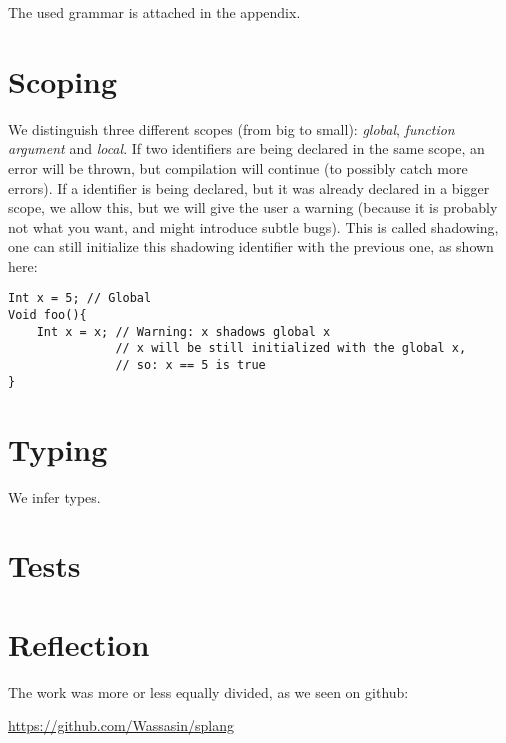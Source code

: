 \documentclass[14pt]{amsart}
\begin{document}
The used grammar is attached in the appendix.

\section{Scoping}
We distinguish three different scopes (from big to small): \emph{global}, \emph{function argument} and \emph{local}. If two identifiers are being declared in the same scope, an error will be thrown, but compilation will continue (to possibly catch more errors). If a identifier is being declared, but it was already declared in a bigger scope, we allow this, but we will give the user a warning (because it is probably not what you want, and might introduce subtle bugs). This is called shadowing, one can still initialize this shadowing identifier with the previous one, as shown here:

\begin{lstlisting}
Int x = 5; // Global
Void foo(){
    Int x = x; // Warning: x shadows global x
               // x will be still initialized with the global x,
               // so: x == 5 is true
}
\end{lstlisting}

\section{Typing}
We infer types.

\section{Tests}

\section{Reflection}
The work was more or less equally divided, as we seen on github:

\url{https://github.com/Wassasin/splang}
\end{document}
